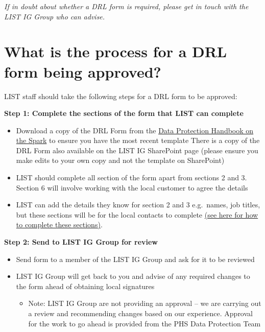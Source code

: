 \documentclass[
]{book}
\providecommand{\tightlist}{%
  \setlength{\itemsep}{0pt}\setlength{\parskip}{0pt}}
\begin{document}
\emph{If in doubt about whether a DRL form is required, please get in touch with the LIST IG Group who can advise.}

\hypertarget{what-is-the-process-for-a-drl-form-being-approved}{%
\section{What is the process for a DRL form being approved?}\label{what-is-the-process-for-a-drl-form-being-approved}}

LIST staff should take the following steps for a DRL form to be approved:

\textbf{Step 1: Complete the sections of the form that LIST can complete}

\begin{itemize}
\item
  Download a copy of the DRL Form from the \href{https://spark.publichealthscotland.org/corporate-guidance/information-governance/data-protection/data-protection-handbook/data-release-and-linkage-form/}{Data Protection Handbook on the Spark} to ensure you have the most recent template There is a copy of the DRL Form also available on the LIST IG SharePoint page (please ensure you make edits to your own copy and not the template on SharePoint)
\item
  LIST should complete all section of the form apart from sections 2 and 3. Section 6 will involve working with the local customer to agree the details
\item
  LIST can add the details they know for section 2 and 3 e.g.~names, job titles, but these sections will be for the local contacts to complete \protect\hyperlink{drlcompletion}{(see here for how to complete these sections)}.
\end{itemize}

\textbf{Step 2: Send to LIST IG Group for review}

\begin{itemize}
\item
  Send form to a member of the LIST IG Group and ask for it to be reviewed
\item
  LIST IG Group will get back to you and advise of any required changes to the form ahead of obtaining local signatures

  \begin{itemize}
  \tightlist
  \item
    Note: LIST IG Group are not providing an approval -- we are carrying out a review and recommending changes based on our experience. Approval for the work to go ahead is provided from the PHS Data Protection Team
  \end{itemize}
\end{itemize}
\end{document}
